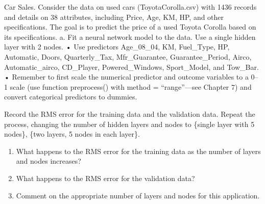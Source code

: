 \documentclass[
]{article}
\newenvironment{Shaded}{\begin{snugshade}}{\end{snugshade}}
\newcommand{\DecValTok}[1]{\textcolor[rgb]{0.00,0.00,0.81}{#1}}
\newcommand{\FunctionTok}[1]{\textcolor[rgb]{0.00,0.00,0.00}{#1}}
\newcommand{\NormalTok}[1]{#1}
\newcommand{\OtherTok}[1]{\textcolor[rgb]{0.56,0.35,0.01}{#1}}
\newcommand{\SpecialCharTok}[1]{\textcolor[rgb]{0.00,0.00,0.00}{#1}}
\newcommand{\StringTok}[1]{\textcolor[rgb]{0.31,0.60,0.02}{#1}}
\begin{document}
Car Sales. Consider the data on used cars (ToyotaCorolla.csv) with 1436
records and details on 38 attributes, including Price, Age, KM, HP, and
other specifications. The goal is to predict the price of a used Toyota
Corolla based on its specifications. a. Fit a neural network model to
the data. Use a single hidden layer with 2 nodes. • Use predictors
Age\_08\_04, KM, Fuel\_Type, HP, Automatic, Doors, Quarterly\_Tax,
Mfr\_Guarantee, Guarantee\_Period, Airco, Automatic\_airco, CD\_Player,
Powered\_Windows, Sport\_Model, and Tow\_Bar. • Remember to first scale
the numerical predictor and outcome variables to a 0--1 scale (use
function preprocess() with method = ``range''---see Chapter 7) and
convert categorical predictors to dummies.

Record the RMS error for the training data and the validation data.
Repeat the process, changing the number of hidden layers and nodes to
\{single layer with 5 nodes\}, \{two layers, 5 nodes in each layer\}.

\begin{enumerate}
\def\labelenumi{\roman{enumi}.}
\item
  What happens to the RMS error for the training data as the number of
  layers and nodes increases?
\item
  What happens to the RMS error for the validation data?
\item
  Comment on the appropriate number of layers and nodes for this
  application.
\end{enumerate}

\begin{Shaded}
\end{Shaded}
\end{document}
